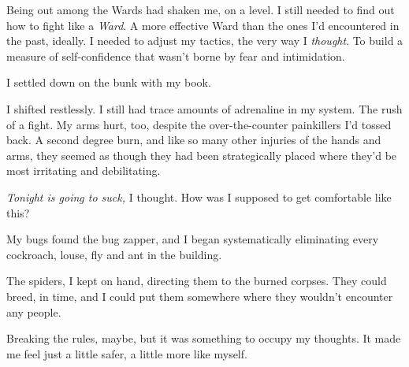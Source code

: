 Being out among the Wards had shaken me, on a level.  I still needed to find out how to fight like a \emph{Ward}.  A more effective Ward than the ones I'd encountered in the past, ideally.  I needed to adjust my tactics, the very way I \emph{thought}.  To build a measure of self-confidence that wasn't borne by fear and intimidation.



I settled down on the bunk with my book.



I shifted restlessly.  I still had trace amounts of adrenaline in my system.  The rush of a fight.  My arms hurt, too, despite the over-the-counter painkillers I'd tossed back.  A second degree burn, and like so many other injuries of the hands and arms, they seemed as though they had been strategically placed where they'd be most irritating and debilitating.



\emph{Tonight is going to suck,} I thought.  How was I supposed to get comfortable like this?



My bugs found the bug zapper, and I began systematically eliminating every cockroach, louse, fly and ant in the building.



The spiders, I kept on hand, directing them to the burned corpses.  They could breed, in time, and I could put them somewhere where they wouldn't encounter any people.



Breaking the rules, maybe, but it was something to occupy my thoughts.  It made me feel just a little safer, a little more like myself.





